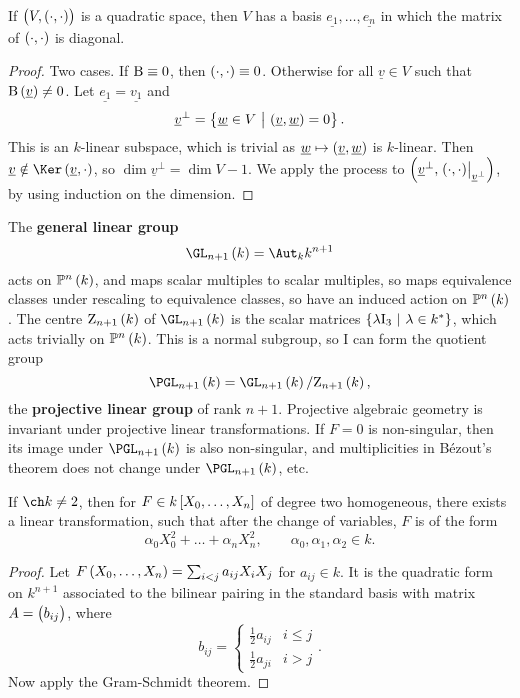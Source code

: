 \begin{theorem}
If $ \br{V, \br{\cdot, \cdot}} $ is a quadratic space, then $ V $ has a basis $ \underline{e_1}, \dots, \underline{e_n} $ in which the matrix of $ \br{\cdot, \cdot} $ is diagonal.
\end{theorem}

\begin{proof}
Two cases. If $ \mathrm{B} \equiv 0 $, then $ \br{\cdot, \cdot} \equiv 0 $. Otherwise for all $ \underline{v} \in V $ such that $ \B\br{\underline{v}} \ne 0 $. Let $ \underline{e_1} = \underline{v_1} $ and
$$ \underline{v}^\perp = \cbr{\underline{w} \in V \st \br{\underline{v}, \underline{w}} = 0}. $$
This is an $ k $-linear subspace, which is trivial as $ \underline{w} \mapsto \br{\underline{v}, \underline{w}} $ is $ k $-linear. Then $ \underline{v} \notin \Ker \br{\underline{v}, \cdot} $, so $ \dim \underline{v}^\perp = \dim V - 1 $. We apply the process to $ \br{\underline{v}^\perp, \eval{\br{\cdot, \cdot}}_{\underline{v}^\perp}} $, by using induction on the dimension.
\end{proof}

\pagebreak

\begin{remark}
The \textbf{general linear group}
$$ \GL_{n + 1}\br{k} = \Aut_k k^{n + 1} $$
acts on $ \PP^n\br{k} $, and maps scalar multiples to scalar multiples, so maps equivalence classes under rescaling to equivalence classes, so have an induced action on $ \PP^n\br{k} $. The centre $ \Z_{n + 1}\br{k} $ of $ \GL_{n + 1}\br{k} $ is the scalar matrices $ \cbr{\lambda \I_3 \st \lambda \in k^*} $, which acts trivially on $ \PP^n\br{k} $. This is a normal subgroup, so I can form the quotient group
$$ \PGL_{n + 1}\br{k} = \GL_{n + 1}\br{k} / \Z_{n + 1}\br{k}, $$
the \textbf{projective linear group} of rank $ n + 1 $. Projective algebraic geometry is invariant under projective linear transformations. If $ F = 0 $ is non-singular, then its image under $ \PGL_{n + 1}\br{k} $ is also non-singular, and multiplicities in B\'ezout's theorem does not change under $ \PGL_{n + 1}\br{k} $, etc.
\end{remark}

\begin{theorem}
If $ \ch k \ne 2 $, then for $ F \in k\sbr{X_0, \dots, X_n} $ of degree two homogeneous, there exists a linear transformation, such that after the change of variables, $ F $ is of the form
$$ \alpha_0X_0^2 + \dots + \alpha_nX_n^2, \qquad \alpha_0, \alpha_1, \alpha_2 \in k. $$
\end{theorem}

\begin{proof}
Let $ F\br{X_0, \dots, X_n} = \sum_{i < j} a_{ij}X_iX_j $ for $ a_{ij} \in k $. It is the quadratic form on $ k^{n + 1} $ associated to the bilinear pairing in the standard basis with matrix $ A = \br{b_{ij}} $, where
$$ b_{ij} =
\begin{cases}
\tfrac{1}{2}a_{ij} & i \le j \\
\tfrac{1}{2}a_{ji} & i > j
\end{cases}.
$$
Now apply the Gram-Schmidt theorem.
\end{proof}

